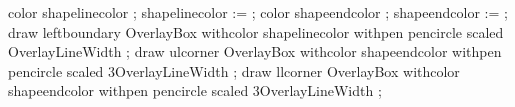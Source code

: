     color shapelinecolor ; shapelinecolor :=  ;
    color shapeendcolor  ; shapeendcolor  :=  ;
    draw leftboundary OverlayBox withcolor shapelinecolor withpen pencircle scaled  OverlayLineWidth ;
    draw ulcorner     OverlayBox withcolor shapeendcolor  withpen pencircle scaled 3OverlayLineWidth ;
    draw llcorner     OverlayBox withcolor shapeendcolor  withpen pencircle scaled 3OverlayLineWidth ;
\stopuniqueMPgraphic

%




\stopenvironment
